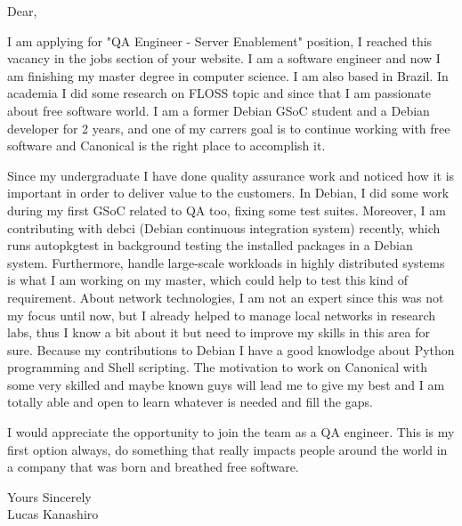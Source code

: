 \documentclass[a4paper,english]{friggeri-letter}
\begin{document}

\address{ 
SHVP Rua 8 chácara 195 casa 4\\
Brasília, DF, 72006-810\\
Brazil
}




   
  

\opening{Dear,} 


I am applying for "QA Engineer - Server Enablement" position, I reached this
vacancy in the jobs section of your website. I am a software engineer and now
I am finishing my master degree in computer science. I am also based in Brazil.
In academia I did some research on FLOSS topic and since that I am passionate
about free software world. I am a former Debian GSoC student and a Debian
developer for 2 years, and one of my carrers goal is to continue working with
free software and Canonical is the right place to accomplish it.

Since my undergraduate I have done quality assurance work and noticed how it is
important in order to deliver value to the customers. In Debian, I did some
work during my first GSoC related to QA too, fixing some test suites.
Moreover, I am contributing with debci (Debian continuous integration system)
recently, which runs autopkgtest in background testing the installed packages
in a Debian system. Furthermore, handle large-scale workloads in highly
distributed systems is what I am working on my master, which could help to
test this kind of requirement. About network technologies, I am not an expert
since this was not my focus until now, but I already helped to manage local
networks in research labs, thus I know a bit about it but need to improve my
skills in this area for sure. Because my contributions to Debian I have a good
knowlodge about Python programming and Shell scripting. The motivation to work
on Canonical with some very skilled and maybe known guys will lead me to give
my best and I am totally able and open to learn whatever is needed and fill the
gaps.

I would appreciate the opportunity to join the team as a QA engineer. This is
my first option always, do something that really impacts people around the
world in a company that was born and breathed free software.


\closing{
   Yours Sincerely\\
   Lucas Kanashiro} 
\end{document}
